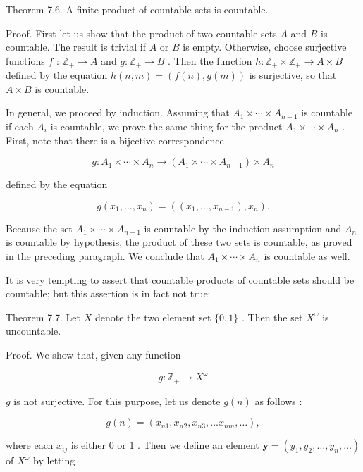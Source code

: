 \documentclass[10pt]{article}
\begin{document}
Theorem 7.6. A finite product of countable sets is countable.

Proof. First let us show that the product of two countable sets \(A\) and \(B\) is countable. The result is trivial if \(A\) or \(B\) is empty. Otherwise, choose surjective functions \(f\) : \({\mathbb{Z}}_{ + } \rightarrow  A\) and \(g : {\mathbb{Z}}_{ + } \rightarrow  B\) . Then the function \(h : {\mathbb{Z}}_{ + } \times  {\mathbb{Z}}_{ + } \rightarrow  A \times  B\) defined by the equation \(h\left( {n,m}\right)  = \left( {f\left( n\right) ,g\left( m\right) }\right)\) is surjective, so that \(A \times  B\) is countable.

In general, we proceed by induction. Assuming that \({A}_{1} \times  \cdots  \times  {A}_{n - 1}\) is countable if each \({A}_{i}\) is countable, we prove the same thing for the product \({A}_{1} \times  \cdots  \times  {A}_{n}\) . First, note that there is a bijective correspondence

\[
g : {A}_{1} \times  \cdots  \times  {A}_{n} \rightarrow  \left( {{A}_{1} \times  \cdots  \times  {A}_{n - 1}}\right)  \times  {A}_{n}
\]

defined by the equation

\[
g\left( {{x}_{1},\ldots ,{x}_{n}}\right)  = \left( {\left( {{x}_{1},\ldots ,{x}_{n - 1}}\right) ,{x}_{n}}\right) .
\]

Because the set \({A}_{1} \times  \cdots  \times  {A}_{n - 1}\) is countable by the induction assumption and \({A}_{n}\) is countable by hypothesis, the product of these two sets is countable, as proved in the preceding paragraph. We conclude that \({A}_{1} \times  \cdots  \times  {A}_{n}\) is countable as well.

It is very tempting to assert that countable products of countable sets should be countable; but this assertion is in fact not true:

Theorem 7.7. Let \(X\) denote the two element set \(\{ 0,1\}\) . Then the set \({X}^{\omega }\) is uncountable.

Proof. We show that, given any function

\[
g : {\mathbb{Z}}_{ + } \rightarrow  {X}^{\omega }
\]

\(g\) is not surjective. For this purpose, let us denote \(g\left( n\right)\) as follows :

\[
g\left( n\right)  = \left( {{x}_{n1},{x}_{n2},{x}_{n3},\ldots {x}_{nm},\ldots }\right) ,
\]

where each \({x}_{ij}\) is either 0 or 1 . Then we define an element \(\mathbf{y} = \left( {{y}_{1},{y}_{2},\ldots ,{y}_{n},\ldots }\right)\) of \({X}^{\omega }\) by letting
\end{document}

